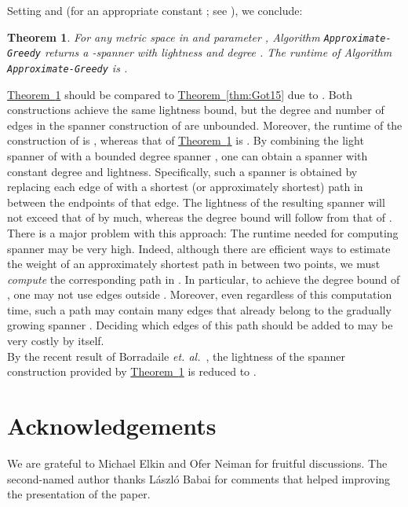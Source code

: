 \documentclass[11pt,letterpaper]{article}
\newtheorem{theorem}{Theorem}
\newcommand{\etal}{\emph{et. al.}}
\newcommand{\namedref}[2]{\hyperref[#2]{#1~\ref*{#2}}}
\newcommand{\theoremref}[1]{\namedref{Theorem}{#1}}
\begin{document}
Setting  and  (for an appropriate constant ; see \cite{GLN02,NS07}), we conclude:
\begin{theorem}  \label{finish} \sloppy
	For any  metric  space  in  and parameter , Algorithm \texttt{Approximate-Greedy}
	returns a -spanner with lightness  and degree .
	The runtime of Algorithm \texttt{Approximate-Greedy} is .
\end{theorem}
	\theoremref{finish} should be compared to \theoremref{thm:Got15} due to \cite{Got15}.
Both constructions achieve the same lightness bound, but the degree and number of edges in the spanner construction of \cite{Got15} are unbounded.
Moreover, the runtime of the construction of \cite{Got15} is , whereas that
of \theoremref{finish} is .
By combining the light spanner  of \cite{Got15} with a bounded degree spanner , one can obtain a spanner with constant degree and   lightness.
Specifically, such a spanner  is obtained by replacing each edge of  with a shortest (or approximately shortest) path in  between the endpoints of that edge.
The lightness of the resulting spanner  will not exceed that of  by much, whereas the degree bound  will follow from that of .
There is a major problem with this approach: The runtime needed for computing spanner  may be very high.
Indeed, although there are efficient ways to estimate the weight of an approximately shortest path in  between two points,
we must \emph{compute} the corresponding path in .
In particular, to achieve the degree bound of , one may not use edges outside .
Moreover, even regardless of this computation time, such a path may contain many edges that already belong to the gradually growing spanner .
Deciding which edges of this path should be added to  may be very costly by itself.\\
By the recent result of Borradaile \etal ~\cite{BLW19}, the lightness of the spanner construction provided by   \theoremref{finish} is reduced to .


\section{Acknowledgements}  We are grateful to Michael Elkin and Ofer Neiman for fruitful discussions.
The second-named author thanks L\'{a}szl\'{o} Babai for comments that helped improving the presentation of the paper.



\end{document}
